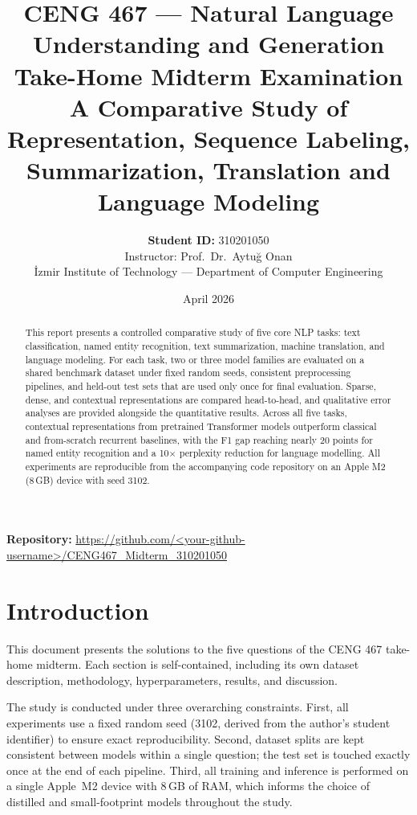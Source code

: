 \documentclass[11pt,a4paper]{article}
\title{
    \vspace{-1cm}
    \large CENG 467 — Natural Language Understanding and Generation \\
    \vspace{0.4cm}
    \LARGE\textbf{Take-Home Midterm Examination} \\
    \vspace{0.6cm}
    \large A Comparative Study of Representation, Sequence Labeling, \\
    Summarization, Translation and Language Modeling
}
\author{
    \textbf{Student ID:} 310201050 \\
    \vspace{0.2cm}
    \small Instructor: Prof.\ Dr.\ Aytu\u{g} Onan \\
    \small \.{I}zmir Institute of Technology --- Department of Computer Engineering
}
\date{April 2026}
\begin{document}
\maketitle

\thispagestyle{empty}
\vspace{0.5cm}

\begin{abstract}
\noindent
This report presents a controlled comparative study of five core
NLP tasks: text classification, named entity recognition,
text summarization, machine translation, and language modeling.
For each task, two or three model families are evaluated on a
shared benchmark dataset under fixed random seeds, consistent
preprocessing pipelines, and held-out test sets that are used only
once for final evaluation. Sparse, dense, and contextual
representations are compared head-to-head, and qualitative error
analyses are provided alongside the quantitative results. Across
all five tasks, contextual representations from pretrained
Transformer models outperform classical and from-scratch recurrent
baselines, with the F1 gap reaching nearly 20 points for named
entity recognition and a 10$\times$ perplexity reduction for
language modelling. All experiments are reproducible from the
accompanying code repository on an Apple M2 (8\,GB) device with
seed 3102.
\end{abstract}

\vspace{0.5cm}
\noindent
\textbf{Repository:}
\url{https://github.com/<your-github-username>/CENG467_Midterm_310201050}

\vspace{1cm}
\tableofcontents

\newpage

\section{Introduction}

This document presents the solutions to the five questions of the
CENG 467 take-home midterm. Each section is self-contained, including
its own dataset description, methodology, hyperparameters, results,
and discussion.

The study is conducted under three overarching constraints. First,
all experiments use a fixed random seed (3102, derived from the
author's student identifier) to ensure exact reproducibility.
Second, dataset splits are kept consistent between models within a
single question; the test set is touched exactly once at the end of
each pipeline. Third, all training and inference is performed on a
single Apple~M2 device with 8\,GB of RAM, which informs the choice
of distilled and small-footprint models throughout the study.
\end{document}
